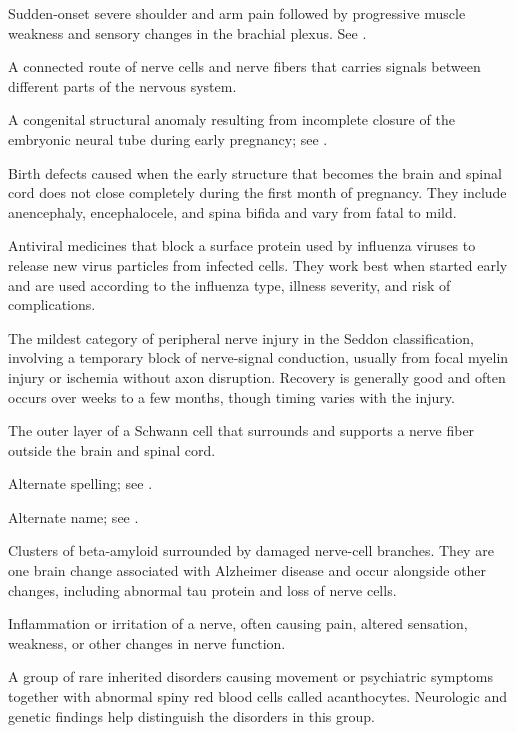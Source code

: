  Sudden-onset severe shoulder and arm pain followed by progressive muscle weakness and sensory changes in the brachial plexus. See .

 A connected route of nerve cells and nerve fibers that carries signals between different parts of the nervous system.

 A congenital structural anomaly resulting from incomplete closure of the embryonic neural tube during early pregnancy; see .

 Birth defects caused when the early structure that becomes the brain and spinal cord does not close completely during the first month of pregnancy. They include anencephaly, encephalocele, and spina bifida and vary from fatal to mild.

 Antiviral medicines that block a surface protein used by influenza viruses to release new virus particles from infected cells. They work best when started early and are used according to the influenza type, illness severity, and risk of complications.

 The mildest category of peripheral nerve injury in the Seddon classification, involving a temporary block of nerve-signal conduction, usually from focal myelin injury or ischemia without axon disruption. Recovery is generally good and often occurs over weeks to a few months, though timing varies with the injury.

 The outer layer of a Schwann cell that surrounds and supports a nerve fiber outside the brain and spinal cord.

 Alternate spelling; see .

 Alternate name; see .

 Clusters of beta-amyloid surrounded by damaged nerve-cell branches. They are one brain change associated with Alzheimer disease and occur alongside other changes, including abnormal tau protein and loss of nerve cells.

 Inflammation or irritation of a nerve, often causing pain, altered sensation, weakness, or other changes in nerve function.

 A group of rare inherited disorders causing movement or psychiatric symptoms together with abnormal spiny red blood cells called acanthocytes. Neurologic and genetic findings help distinguish the disorders in this group.

